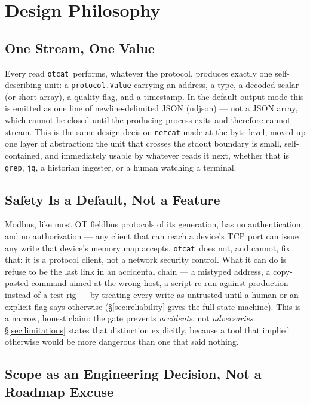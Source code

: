 \documentclass[10pt,conference]{IEEEtran}
\newcommand{\otcat}{\texttt{otcat}}
\newcommand{\code}[1]{\texttt{#1}}
\begin{document}
\section{Design Philosophy}
\label{sec:philosophy}

\subsection{One Stream, One Value}

Every read \otcat\ performs, whatever the protocol, produces exactly
one self-describing unit: a \code{protocol.Value} carrying an address,
a type, a decoded scalar (or short array), a quality flag, and a
timestamp. In the default output mode this is emitted as one line of
newline-delimited JSON (ndjson) --- not a JSON array, which cannot be
closed until the producing process exits and therefore cannot stream.
This is the same design decision \code{netcat} made at the byte level,
moved up one layer of abstraction: the unit that crosses the
stdout boundary is small, self-contained, and immediately usable by
whatever reads it next, whether that is \code{grep}, \code{jq}, a
historian ingester, or a human watching a terminal.

\subsection{Safety Is a Default, Not a Feature}
\label{sec:safety-philosophy}

Modbus, like most OT fieldbus protocols of its generation, has no
authentication and no authorization --- any client that can reach a
device's TCP port can issue any write that device's memory map
accepts. \otcat\ does not, and cannot, fix that: it is a protocol
client, not a network security control. What it can do is refuse to be
the last link in an accidental chain --- a mistyped address, a
copy-pasted command aimed at the wrong host, a script re-run against
production instead of a test rig --- by treating every write as
untrusted until a human or an explicit flag says otherwise
(\S\ref{sec:reliability} gives the full state machine). This is a
narrow, honest claim: the gate prevents \emph{accidents}, not
\emph{adversaries}. \S\ref{sec:limitations} states that distinction
explicitly, because a tool that implied otherwise would be more
dangerous than one that said nothing.

\subsection{Scope as an Engineering Decision, Not a Roadmap Excuse}
\end{document}
